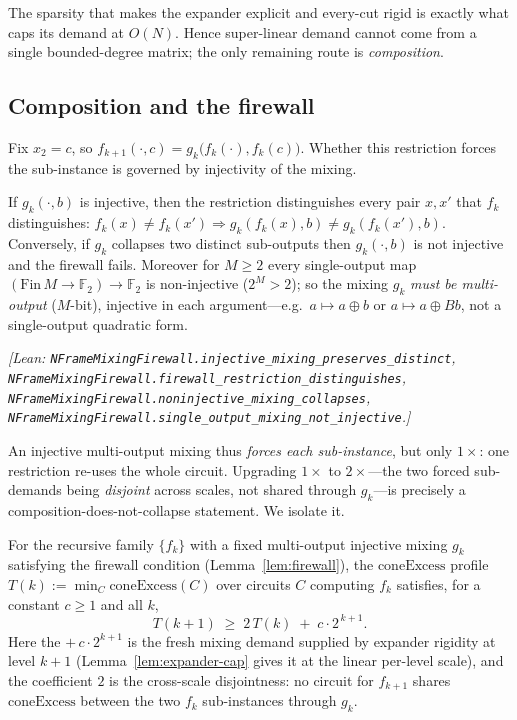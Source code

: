 The sparsity that makes the expander explicit and every-cut rigid is exactly what
caps its demand at $O(N)$.  Hence super-linear demand cannot come from a single
bounded-degree matrix; the only remaining route is \emph{composition}.

\subsection{Composition and the firewall}
\label{ss:firewall}

Fix $x_2=c$, so $f_{k+1}(\cdot,c)=g_k\!\bigl(f_k(\cdot),f_k(c)\bigr)$.  Whether
this restriction forces the sub-instance is governed by injectivity of the mixing.

\begin{lemma}
\label{lem:firewall}
If $g_k(\cdot,b)$ is injective, then the restriction distinguishes every pair
$x,x'$ that $f_k$ distinguishes: $f_k(x)\ne f_k(x')\Rightarrow
g_k(f_k(x),b)\ne g_k(f_k(x'),b)$.  Conversely, if $g_k$ collapses two distinct
sub-outputs then $g_k(\cdot,b)$ is not injective and the firewall fails.  Moreover
for $M\ge 2$ every single-output map $(\mathrm{Fin}\,M\to\mathbb F_2)\to\mathbb
F_2$ is non-injective ($2^{M}>2$); so the mixing $g_k$ \emph{must be
multi-output} ($M$-bit), injective in each argument---e.g.\ $a\mapsto a\oplus b$
or $a\mapsto a\oplus Bb$, not a single-output quadratic form.
\end{lemma}
\noindent\emph{[Lean:
\texttt{NFrameMixingFirewall.injective\_mixing\_preserves\_distinct},
\texttt{NFrameMixingFirewall.firewall\_restriction\_distinguishes},
\texttt{NFrameMixingFirewall.noninjective\_mixing\_collapses},
\texttt{NFrameMixingFirewall.single\_output\_mixing\_not\_injective}.]}

An injective multi-output mixing thus \emph{forces each sub-instance}, but only
$1\times$: one restriction re-uses the whole circuit.  Upgrading $1\times$ to
$2\times$---the two forced sub-demands being \emph{disjoint} across scales, not
shared through $g_k$---is precisely a composition-does-not-collapse statement.  We
isolate it.

\begin{assumption}
\label{ass:krw-c}
For the recursive family $\{f_k\}$ with a fixed multi-output injective mixing
$g_k$ satisfying the firewall condition (Lemma~\ref{lem:firewall}), the
$\mathrm{coneExcess}$ profile $T(k):=\min_{C}\mathrm{coneExcess}(C)$ over circuits
$C$ computing $f_k$ satisfies, for a constant $c\ge 1$ and all $k$,
\[
  T(k+1)\;\ge\;2\,T(k)\;+\;c\cdot 2^{\,k+1}.
\]
Here the $+\,c\cdot 2^{k+1}$ is the fresh mixing demand supplied by expander
rigidity at level $k{+}1$ (Lemma~\ref{lem:expander-cap} gives it at the linear
per-level scale), and the coefficient $2$ is the cross-scale disjointness: no
circuit for $f_{k+1}$ shares $\mathrm{coneExcess}$ between the two $f_k$
sub-instances through $g_k$.
\end{assumption}

